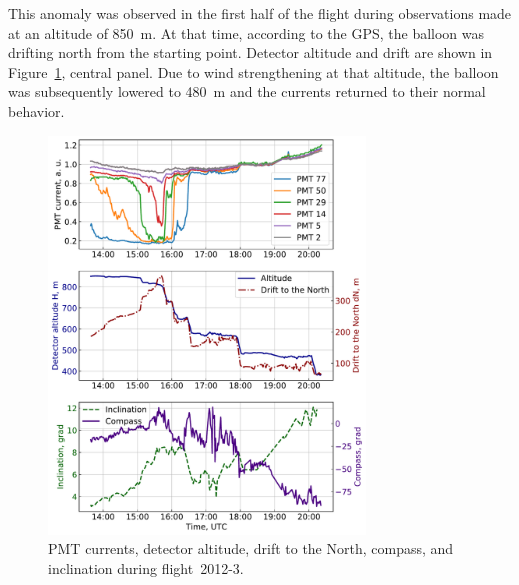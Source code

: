 \documentclass[universe,article,accept,moreauthors,pdftex]{Definitions/mdpi}
\begin{document}
       

This anomaly was observed in the first half of the flight during observations made at an altitude of 850~m. At that time, according to the GPS, the balloon was drifting north from the starting point. Detector altitude and drift are shown in Figure~\ref{fig:2012-3_currents}, central panel. Due to wind strengthening at that altitude, the balloon was subsequently lowered to 480~m and the currents returned to their normal behavior. 
\begin{figure}[H]
        \includegraphics[width=0.75\textwidth]{2012-3_currents_H_dN.pdf}
        \caption{PMT currents, detector altitude, drift to the North, compass, and inclination during flight~2012-3.}
        \label{fig:2012-3_currents}
\end{figure}
\end{document}
